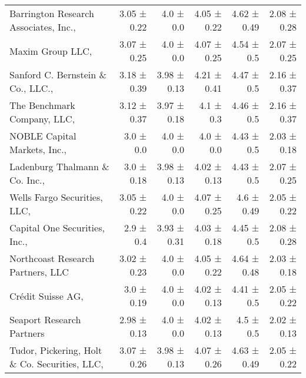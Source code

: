 \begin{tabular}{lrrrrr}
Barrington Research Associates, Inc.,  & 3.05 ± 0.22 & 4.0 ± 0.0 & 4.05 ± 0.22 & 4.62 ± 0.49 & 2.08 ± 0.28 \\
Maxim Group LLC,  & 3.07 ± 0.25 & 4.0 ± 0.0 & 4.07 ± 0.25 & 4.54 ± 0.5 & 2.07 ± 0.25 \\
Sanford C. Bernstein \& Co., LLC.,  & 3.18 ± 0.39 & 3.98 ± 0.13 & 4.21 ± 0.41 & 4.47 ± 0.5 & 2.16 ± 0.37 \\
The Benchmark Company, LLC,  & 3.12 ± 0.37 & 3.97 ± 0.18 & 4.1 ± 0.3 & 4.46 ± 0.5 & 2.16 ± 0.37 \\
NOBLE Capital Markets, Inc.,  & 3.0 ± 0.0 & 4.0 ± 0.0 & 4.0 ± 0.0 & 4.43 ± 0.5 & 2.03 ± 0.18 \\
Ladenburg Thalmann \& Co. Inc.,  & 3.0 ± 0.18 & 3.98 ± 0.13 & 4.02 ± 0.13 & 4.43 ± 0.5 & 2.07 ± 0.25 \\
Wells Fargo Securities, LLC,  & 3.05 ± 0.22 & 4.0 ± 0.0 & 4.07 ± 0.25 & 4.6 ± 0.49 & 2.05 ± 0.22 \\
Capital One Securities, Inc.,  & 2.9 ± 0.4 & 3.93 ± 0.31 & 4.03 ± 0.18 & 4.45 ± 0.5 & 2.08 ± 0.28 \\
Northcoast Research Partners, LLC & 3.02 ± 0.23 & 4.0 ± 0.0 & 4.05 ± 0.22 & 4.64 ± 0.48 & 2.03 ± 0.18 \\
Cr\'edit Suisse AG,  & 3.0 ± 0.19 & 4.0 ± 0.0 & 4.02 ± 0.13 & 4.41 ± 0.5 & 2.05 ± 0.22 \\
Seaport Research Partners & 2.98 ± 0.13 & 4.0 ± 0.0 & 4.02 ± 0.13 & 4.5 ± 0.5 & 2.02 ± 0.13 \\
Tudor, Pickering, Holt \& Co. Securities, LLC,  & 3.07 ± 0.26 & 3.98 ± 0.13 & 4.07 ± 0.26 & 4.63 ± 0.49 & 2.05 ± 0.22 \\
\bottomrule
\end{tabular}

\newpage

